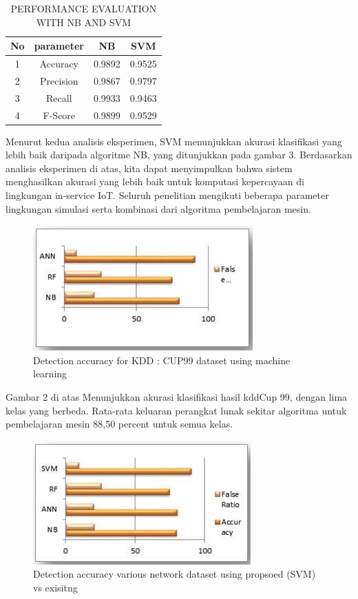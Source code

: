 \documentclass[conference]{IEEEtran}
\begin{document}
{\begin{table}[hptb]
    \centering
    \caption{PERFORMANCE EVALUATION WITH NB AND SVM}
\begin{tabular}{|c|c|c|c|}
\hline
No & parameter & NB & SVM\\
\hline
1   & Accuracy & 0.9892 & 0.9525\\
\hline
2   & Precision & 0.9867 & 0.9797\\
\hline
3   & Recall & 0.9933 & 0.9463 \\
\hline
4   & F-Score& 0.9899 & 0.9529 \\
\hline
\end{tabular}
\end{table}

Menurut kedua analisis eksperimen, SVM menunjukkan akurasi klasifikasi yang lebih baik daripada algoritme NB, yang ditunjukkan pada gambar 3. Berdasarkan analisis eksperimen di atas, kita dapat menyimpulkan bahwa sistem menghasilkan akurasi yang lebih baik untuk komputasi kepercayaan di lingkungan in-service IoT. Seluruh penelitian mengikuti beberapa parameter lingkungan simulasi serta kombinasi dari algoritma pembelajaran mesin.

\begin{figure}
\centering
\includegraphics[width=.3\textwidth]{Gambar/pct2.jpg}
\caption{Detection accuracy for KDD : CUP99 dataset using machine learning}
\end{figure}

Gambar 2 di atas Menunjukkan akurasi klasifikasi hasil kddCup 99, dengan lima kelas yang berbeda. Rata-rata keluaran perangkat lunak sekitar algoritma untuk pembelajaran mesin 88,50 percent untuk semua kelas.

\begin{figure}
\centering
\includegraphics[width=.3\textwidth]{Gambar/pct3.jpg}
\caption{Detection accuracy various network dataset using propsoed (SVM) vs exisitng}
\end{figure}

}
\end{document}
